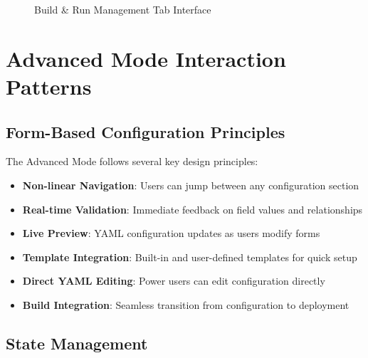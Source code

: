 \documentclass[11pt,a4paper]{article}
\newcommand{\emoji}[1]{{\emojifont #1}}
\begin{document}
\begin{figure}[htbp]
\caption{Build \& Run Management Tab Interface}
\end{figure}

\section{Advanced Mode Interaction Patterns}

\subsection{Form-Based Configuration Principles}

The Advanced Mode follows several key design principles:

\begin{itemize}
    \item \textbf{Non-linear Navigation}: Users can jump between any configuration section
    \item \textbf{Real-time Validation}: Immediate feedback on field values and relationships
    \item \textbf{Live Preview}: YAML configuration updates as users modify forms
    \item \textbf{Template Integration}: Built-in and user-defined templates for quick setup
    \item \textbf{Direct YAML Editing}: Power users can edit configuration directly
    \item \textbf{Build Integration}: Seamless transition from configuration to deployment
\end{itemize}

\subsection{State Management}
\end{document}
